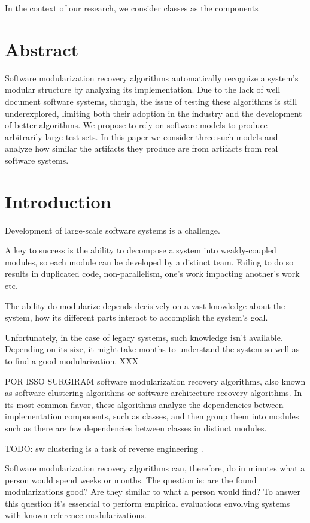 In the context of our research, we consider classes as the components

\section{Abstract}

Software modularization recovery algorithms automatically recognize a system's
modular structure by analyzing its implementation.
Due to the lack of well document software systems, though, the issue of testing
these algorithms is still underexplored, limiting both their adoption in the
industry and the development of better algorithms.
We propose to rely on software models to produce arbitrarily large test sets. In
this paper we consider three such models and analyze how similar the artifacts
they produce are from artifacts from real software systems.
\cite{Pollet2007}

\section{Introduction}

Development of large-scale software systems is a challenge.

A key to success is the ability to decompose a system into weakly-coupled
modules, so each module can be developed by a distinct team. Failing to do so
results in duplicated code, non-parallelism, one's work impacting another's work
etc.

The ability do modularize depends decisively on a vast knowledge about the
system, how its different parts interact to accomplish the system's goal.

Unfortunately, in the case of legacy systems, such knowledge isn't available.
Depending on its size, it might take months to understand the system so well as
to find a good modularization. XXX \cite{Parnas1972}

POR ISSO SURGIRAM software modularization recovery algorithms, also known as
software clustering algorithms or software architecture recovery algorithms. In
its most common flavor, these algorithms analyze the dependencies between
implementation components, such as classes, and then group them into modules
such as there are few dependencies between classes in distinct modules.

TODO: sw clustering is a task of reverse engineering \cite{Tonella2007}.

Software modularization recovery algorithms can, therefore, do in minutes what a
person would spend weeks or months. The question is: are the found
modularizations good? Are they similar to what a person would find? To answer
this question it's essencial to perform empirical evaluations envolving systems
with known reference modularizations.

